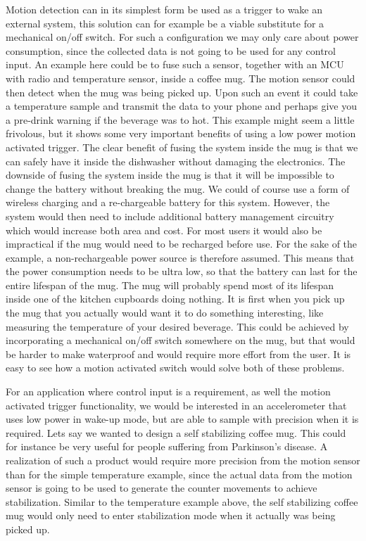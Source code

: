Motion detection can in its simplest form be used as a trigger to wake an external system, this solution can for example be a viable substitute for a mechanical on/off switch. For such a configuration we may only care about power consumption, since the collected data is not going to be used for any control input. An example here could be to fuse such a sensor, together with an MCU with radio and temperature sensor, inside a coffee mug. The motion sensor could then detect when the mug was being picked up. Upon such an event it could take a temperature sample and transmit the data to your phone and perhaps give you a pre-drink warning if the beverage was to hot. This example might seem a little frivolous, but it shows some very important benefits of using a low power motion activated trigger. The clear benefit of fusing the system inside the mug is that we can safely have it inside the dishwasher without damaging the electronics. The downside of fusing the system inside the mug is that it will be impossible to change the battery without breaking the mug. We could of course use a form of wireless charging and a re-chargeable battery for this system. However, the system would then need to include additional battery management circuitry which would increase both area and cost. For most users it would also be impractical if the mug would need to be recharged before use. For the sake of the example, a non-rechargeable power source is therefore assumed. This means that the power consumption needs to be ultra low, so that the battery can last for the entire lifespan of the mug. The mug will probably spend most of its lifespan inside one of the kitchen cupboards doing nothing. It is first when you pick up the mug that you actually would want it to do something interesting, like measuring the temperature of your desired beverage. This could be achieved by incorporating a mechanical on/off switch somewhere on the mug, but that would be harder to make waterproof and would require more effort from the user. It is easy to see how a motion activated switch would solve both of these problems. 

For an application where control input is a requirement, as well the motion activated trigger functionality, we would be interested in an accelerometer that uses low power in wake-up mode, but are able to sample with precision when it is required. Lets say we wanted to design a self stabilizing coffee mug. This could for instance be very useful for people suffering from Parkinson's disease. A realization of such a product would require more precision from the motion sensor than for the simple temperature example, since the actual data from the motion sensor is going to be used to generate the counter movements to achieve stabilization. Similar to the temperature example above, the self stabilizing coffee mug would only need to enter stabilization mode when it actually was being picked up. 

